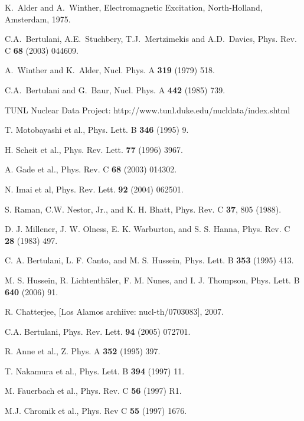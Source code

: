 \documentclass[prc,preprint,showpacs,showkeys,nofootinbib]{revtex4}%
\begin{document}
\begin{thebibliography}{99}                                                                                               %


K.~Alder and A.~Winther, Electromagnetic Excitation,
North-Holland, Amsterdam, 1975.

C.A.~Bertulani, A.E.~Stuchbery, T.J.~Mertzimekis and
A.D.~Davies, Phys. Rev. C \textbf{68} (2003) 044609.

A.~Winther and K.~Alder, Nucl. Phys. A \textbf{319} (1979) 518.

C.A.~Bertulani and G.~Baur, Nucl. Phys. A \textbf{442} (1985) 739.

TUNL Nuclear Data Project: http://www.tunl.duke.edu/nucldata/index.shtml

T. Motobayashi et al., Phys. Lett. B \textbf{346} (1995) 9.

H. Scheit et al., Phys. Rev. Lett. \textbf{77} (1996) 3967.

A. Gade et al., Phys. Rev. C \textbf{68} (2003) 014302.

N. Imai et al, Phys. Rev. Lett. \textbf{92} (2004) 062501.

S. Raman, C.W. Nestor, Jr., and K. H. Bhatt, Phys. Rev. C
\textbf{37}, 805 (1988).

D. J. Millener, J. W. Olness, E. K. Warburton, and S. S. Hanna,
Phys. Rev. C \textbf{28} (1983) 497.

C. A. Bertulani, L. F. Canto, and M. S. Hussein, Phys. Lett. B
\textbf{353} (1995) 413.

M. S. Hussein, R. Lichtenth\"{a}ler, F. M. Nunes, and I. J.
Thompson, Phys. Lett. B \textbf{640} (2006) 91.

 R. Chatterjee, [Los Alamos archiive: nucl-th/0703083], 2007.

C.A. Bertulani, Phys. Rev. Lett. \textbf{94} (2005) 072701.

R. Anne et al., Z. Phys. A \textbf{352} (1995) 397.

T. Nakamura et al., Phys. Lett. B \textbf{394} (1997) 11.

M. Fauerbach et al., Phys. Rev. C \textbf{56} (1997) R1.

M.J. Chromik et al., Phys. Rev C \textbf{55} (1997) 1676.


\end{thebibliography}
\end{document}
